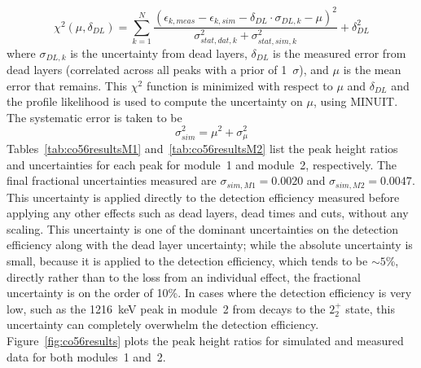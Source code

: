 \documentclass[notitlepage,rmp,aps,10pt]{revtex4-1}
\newcommand{\iso}[2]{$^{#1}$#2}
\newcommand{\Co}[1]{\iso{#1}{Co}}
\newcommand{\SP}[3]{$#1^{#2}_{#3}$}
\begin{document}
\begin{equation}
  \chi^2(\mu, \delta_{DL}) = \displaystyle\sum_{k=1}^N \frac{(\epsilon_{k, meas}-\epsilon_{k, sim}-\delta_{DL}\cdot\sigma_{DL,k} - \mu)^2}{\sigma_{stat,dat,k}^2+\sigma_{stat,sim,k}^2} + \delta_{DL}^2
\end{equation}
where $\sigma_{DL,k}$ is the uncertainty from dead layers, $\delta_{DL}$ is the measured error from dead layers (correlated across all peaks with a prior of 1~$\sigma$), and $\mu$ is the mean error that remains.
This $\chi^2$ function is minimized with respect to $\mu$ and $\delta_{DL}$ and the profile likelihood is used to compute the uncertainty on $\mu$, using MINUIT\cite{minuit}.
The systematic error is taken to be
\begin{equation}
  \sigma_{sim}^2 = \mu^2 + \sigma_\mu^2
\end{equation}
Tables~\ref{tab:co56resultsM1} and~\ref{tab:co56resultsM2} list the peak height ratios and uncertainties for each peak for module~1 and module~2, respectively.
The final fractional uncertainties measured are $\sigma_{sim,M1}=0.0020$ and $\sigma_{sim,M2}=0.0047$.
This uncertainty is applied directly to the detection efficiency measured before applying any other effects such as dead layers, dead times and cuts, without any scaling.
This uncertainty is one of the dominant uncertainties on the detection efficiency along with the dead layer uncertainty; while the absolute uncertainty is small, because it is applied to the detection efficiency, which tends to be ${\sim}5$\%, directly rather than to the loss from an individual effect, the fractional uncertainty is on the order of 10\%.
In cases where the detection efficiency is very low, such as the 1216~keV peak in module~2 from decays to the \SP{2}{+}{2} state, this uncertainty can completely overwhelm the detection efficiency.
Figure~\ref{fig:co56results} plots the peak height ratios for simulated and measured data for both modules~1 and~2.

\begin{table}[h]
  \caption[Table of peak height ratios for module~1]{\label{tab:co56resultsM1}
    Table of measured peak height ratios between multiplicity~1 events and multiplicity~2 events containing a 511~keV annihalation $\gamma$ in module~1 for both simulated and measured \Co{56} spectra, with uncertainties. A plot of these numbers is shown in Figure~\ref{fig:co56results}
  }
  
\end{table}

\begin{table}[h]
  \caption[Table of peak height ratios for module~2]{\label{tab:co56resultsM2}
    Table of measured peak height ratios between multiplicity~1 events and multiplicity~2 events containing a 511~keV annihalation $\gamma$ in module~2 for both simulated and measured \Co{56} spectra, with uncertainties. A plot of these numbers is shown in Figure~\ref{fig:co56results}
  }
  
\end{table}
\end{document}
